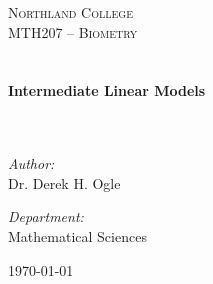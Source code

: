 \dominitoc
\setcounter{minitocdepth}{1} %

\begin{titlepage}
\begin{center}

\textsc{\LARGE Northland College}\\[0.5cm]
\textsc{\Large MTH207 -- Biometry}\\[1.5cm]

\HRuleW \\
\HRule \\[1cm]
{ \huge \bfseries Intermediate Linear Models}\\[1cm]
\HRule \\
\HRuleW \\[1.5cm]

\begin{minipage}{0.4\textwidth}
\begin{flushleft}
  \Large \emph{Author:}\\ Dr. Derek H. Ogle
\end{flushleft}
\end{minipage}
\begin{minipage}{0.4\textwidth}
\begin{flushright} 
  \Large \emph{Department:}\\ Mathematical Sciences
\end{flushright}
\end{minipage}

\vfill

{\Large \today}

\end{center}

\end{titlepage}

\setcounter{tocdepth}{0} %

\renewcommand{\cftpartfont}{\scshape}     %

